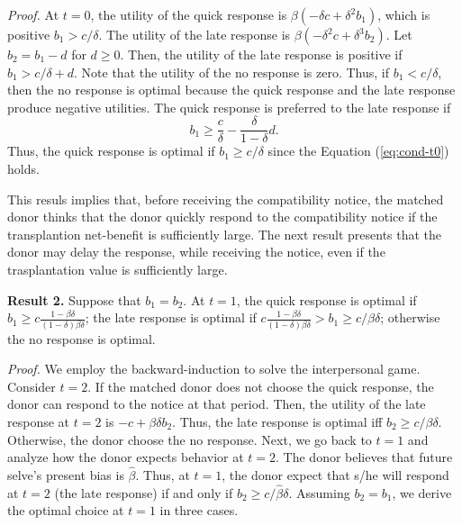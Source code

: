 \documentclass[
]{article}
\begin{document}
\noindent
\emph{Proof.} At \(t=0\), the utility of the quick response is \(\beta(-\delta c + \delta^2 b_1)\), which is positive \(b_1 > c / \delta\). The utility of the late response is \(\beta(-\delta^2 c + \delta^3 b_2)\). Let \(b_2 = b_1 - d\) for \(d \ge 0\). Then, the utility of the late response is positive if \(b_1 > c/\delta + d\). Note that the utility of the no response is zero. Thus, if \(b_1 < c/\delta\), then the no response is optimal because the quick response and the late response produce negative utilities. The quick response is preferred to the late response if
\begin{equation}
  b_1 \ge \frac{c}{\delta} - \frac{\delta}{1-\delta}d. \label{eq:cond-t0}
\end{equation}
Thus, the quick response is optimal if \(b_1 \ge c/\delta\) since the Equation (\ref{eq:cond-t0}) holds.

This resuls implies that, before receiving the compatibility notice, the matched donor thinks that the donor quickly respond to the compatibility notice if the transplantion net-benefit is sufficiently large. The next result presents that the donor may delay the response, while receiving the notice, even if the trasplantation value is sufficiently large.

\noindent
\textbf{Result 2.} Suppose that \(b_1 = b_2\). At \(t=1\), the quick response is optimal if \(b_1 \ge c \frac{1-\beta\delta}{(1-\delta)\beta\delta}\); the late response is optimal if \(c \frac{1-\beta\delta}{(1-\delta)\beta\delta} > b_1 \ge c/\beta\delta\); otherwise the no response is optimal.

\noindent
\emph{Proof.} We employ the backward-induction to solve the interpersonal game. Consider \(t=2\). If the matched donor does not choose the quick response, the donor can respond to the notice at that period. Then, the utility of the late response at \(t=2\) is \(-c + \beta\delta b_2\). Thus, the late response is optimal iff \(b_2 \ge c/\beta\delta\). Otherwise, the donor choose the no response. Next, we go back to \(t=1\) and analyze how the donor expects behavior at \(t=2\). The donor believes that future selve's present bias is \(\hat{\beta}\). Thus, at \(t = 1\), the donor expect that s/he will respond at \(t = 2\) (the late response) if and only if \(b_2 \ge c/\hat{\beta}\delta\). Assuming \(b_2 = b_1\), we derive the optimal choice at \(t=1\) in three cases.
\end{document}
